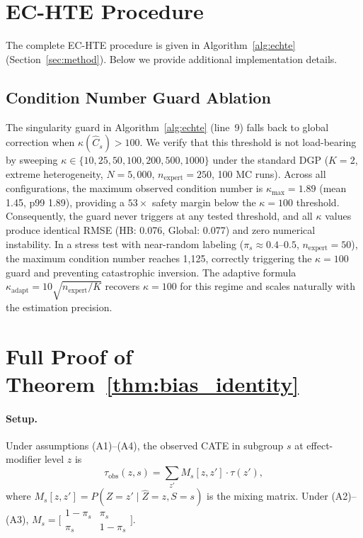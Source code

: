 \section{EC-HTE Procedure}
\label{app:algorithm}

The complete EC-HTE procedure is given in Algorithm~\ref{alg:echte} (Section~\ref{sec:method}).
Below we provide additional implementation details.

\subsection{Condition Number Guard Ablation}
\label{app:kappa_ablation}

The singularity guard in Algorithm~\ref{alg:echte} (line~9) falls back to global correction when $\kappa(\hat{C}_s) > 100$.
We verify that this threshold is not load-bearing by sweeping $\kappa \in \{10, 25, 50, 100, 200, 500, 1000\}$ under the standard DGP ($K{=}2$, extreme heterogeneity, $N{=}5{,}000$, $n_{\text{expert}}{=}250$, 100 MC runs).
Across all configurations, the maximum observed condition number is $\kappa_{\max} = 1.89$ (mean 1.45, p99 1.89), providing a $53{\times}$ safety margin below the $\kappa{=}100$ threshold.
Consequently, the guard never triggers at any tested threshold, and all $\kappa$ values produce identical RMSE (HB: 0.076, Global: 0.077) and zero numerical instability.
In a stress test with near-random labeling ($\pi_s \approx 0.4$--$0.5$, $n_{\text{expert}}{=}50$), the maximum condition number reaches 1{,}125, correctly triggering the $\kappa{=}100$ guard and preventing catastrophic inversion.
The adaptive formula $\kappa_{\text{adapt}} = 10 \sqrt{n_{\text{expert}} / K}$ recovers $\kappa{=}100$ for this regime and scales naturally with the estimation precision.

\section{Full Proof of Theorem~\ref{thm:bias_identity}}
\label{app:derivation}

\paragraph{Setup.}
Under assumptions (A1)--(A4), the observed CATE in subgroup $s$ at effect-modifier level $z$ is
\begin{equation}
\tau_{\text{obs}}(z, s) = \sum_{z'} M_s[z, z'] \cdot \tau(z'),
\end{equation}
where $M_s[z, z'] = P(Z{=}z' \mid \hat{Z}{=}z, S{=}s)$ is the mixing matrix.
Under (A2)--(A3), $M_s = \bigl[\begin{smallmatrix} 1-\pi_s & \pi_s \\ \pi_s & 1-\pi_s \end{smallmatrix}\bigr]$.

